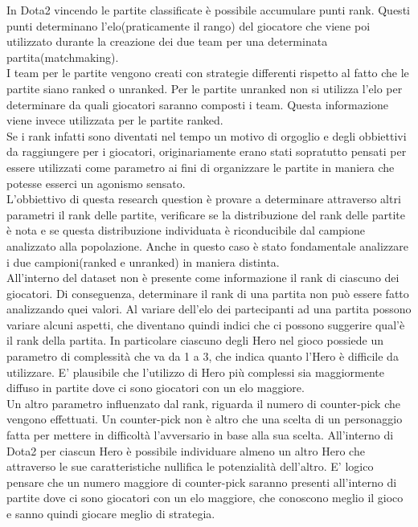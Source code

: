 In Dota2 vincendo le partite classificate è possibile accumulare punti rank. Questi punti determinano l'elo(praticamente il rango) del giocatore che viene poi utilizzato durante la creazione dei due team per una determinata partita(matchmaking). \\
I team per le partite vengono creati con strategie differenti rispetto al fatto che le partite siano ranked o unranked. Per le partite unranked non si utilizza l'elo per determinare da quali giocatori saranno composti i team. Questa informazione viene invece utilizzata per le partite ranked.  \\
Se i rank infatti sono diventati nel tempo un motivo di orgoglio e degli obbiettivi da raggiungere per i giocatori, originariamente erano stati sopratutto pensati per essere utilizzati come parametro ai fini di organizzare le partite in maniera che potesse esserci un agonismo sensato. \\ 
L'obbiettivo di questa research question è provare a determinare attraverso altri parametri il rank delle partite, verificare se la distribuzione del rank delle partite è nota e se questa distribuzione individuata è riconducibile dal campione analizzato alla popolazione. Anche in questo caso è stato fondamentale analizzare i due campioni(ranked e unranked) in maniera distinta. \\
All'interno del dataset non è presente come informazione il rank di ciascuno dei giocatori. Di conseguenza, determinare il rank di una partita non può essere fatto analizzando quei valori. Al variare dell'elo dei partecipanti ad una partita possono variare alcuni aspetti, che diventano quindi indici che ci possono suggerire qual'è il rank della partita. In particolare ciascuno degli Hero nel gioco possiede un parametro di complessità che va da 1 a 3, che indica quanto l'Hero è difficile da utilizzare. E' plausibile che l'utilizzo di Hero più complessi sia maggiormente diffuso in partite dove ci sono giocatori con un elo maggiore. \\
Un altro parametro influenzato dal rank, riguarda il numero di counter-pick che vengono effettuati. Un counter-pick non è altro che una scelta di un personaggio fatta per mettere in difficoltà l'avversario in base alla sua scelta. All'interno di Dota2 per ciascun Hero è possibile individuare almeno un altro Hero che attraverso le sue caratteristiche nullifica le potenzialità dell'altro. E' logico pensare che un numero maggiore di counter-pick saranno presenti all'interno di partite dove ci sono giocatori con un elo maggiore, che conoscono meglio il gioco e sanno quindi giocare meglio di strategia. \\
